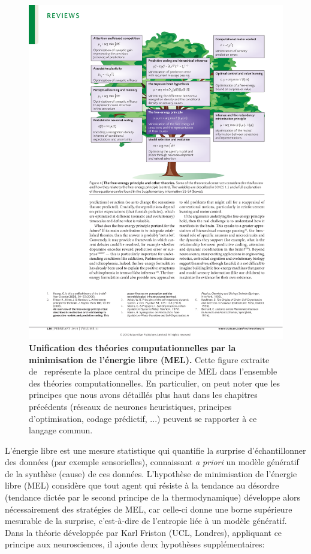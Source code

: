 \documentclass[11pt,french,a4paper,oneside]{article}%
\begin{document}
\begin{figure}%
\centerline{\includegraphics[width=\linewidth]{friston10c_fig4.pdf}}
\caption{\textbf{Unification des théories computationnelles par la minimisation de l'énergie libre (MEL).} 
Cette figure extraite de~\citep{Friston10c} représente la place central du principe de MEL dans l'ensemble des théories computationnelles. En particulier, on peut noter que les principes que nous avons détaillés plus haut dans les chapitres précédents (réseaux de neurones heuristiques, principes d'optimisation, codage prédictif, ...) peuvent se rapporter à ce langage commun. %
 }%
\label{fig:friston10c_fig4}%
\end{figure}%
L'énergie libre est une mesure statistique qui quantifie la surprise d'échantillonner des données (par exemple sensorielles), connaissant \emph{a priori} un modèle génératif de la synthèse (cause) de ces données. L'hypothèse de minimisation de l'énergie libre (MEL) considère que tout agent qui résiste à la tendance au désordre (tendance dictée par le second principe de la thermodynamique) développe alors nécessairement des stratégies de MEL, car celle-ci donne une borne supérieure mesurable de la surprise, c'est-à-dire de l'entropie liée à un modèle génératif. Dans la théorie développée par Karl Friston (UCL, Londres), appliquant ce principe aux neurosciences, il ajoute deux hypothèses supplémentaires:
\end{document}
